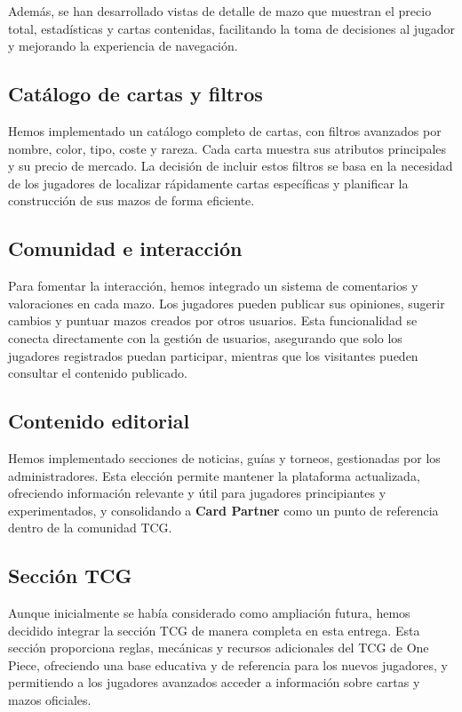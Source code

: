 \documentclass[10pt]{article}
\begin{document}
			Además, se han desarrollado vistas de detalle de mazo que muestran el precio total, estadísticas y cartas contenidas, facilitando la toma de decisiones al jugador y mejorando la experiencia de navegación.

		\subsection{Catálogo de cartas y filtros}
			Hemos implementado un catálogo completo de cartas, con filtros avanzados por nombre, color, tipo, coste y rareza. Cada carta muestra sus atributos principales y su precio de mercado. La decisión de incluir estos filtros se basa en la necesidad de los jugadores de localizar rápidamente cartas específicas y planificar la construcción de sus mazos de forma eficiente.

		\subsection{Comunidad e interacción}
			Para fomentar la interacción, hemos integrado un sistema de comentarios y valoraciones en cada mazo. Los jugadores pueden publicar sus opiniones, sugerir cambios y puntuar mazos creados por otros usuarios. Esta funcionalidad se conecta directamente con la gestión de usuarios, asegurando que solo los jugadores registrados puedan participar, mientras que los visitantes pueden consultar el contenido publicado.

		\subsection{Contenido editorial}
			Hemos implementado secciones de noticias, guías y torneos, gestionadas por los administradores. Esta elección permite mantener la plataforma actualizada, ofreciendo información relevante y útil para jugadores principiantes y experimentados, y consolidando a \textbf{Card Partner} como un punto de referencia dentro de la comunidad TCG.

		\subsection{Sección TCG}
			Aunque inicialmente se había considerado como ampliación futura, hemos decidido integrar la sección TCG de manera completa en esta entrega. Esta sección proporciona reglas, mecánicas y recursos adicionales del TCG de One Piece, ofreciendo una base educativa y de referencia para los nuevos jugadores, y permitiendo a los jugadores avanzados acceder a información sobre cartas y mazos oficiales.
\end{document}
